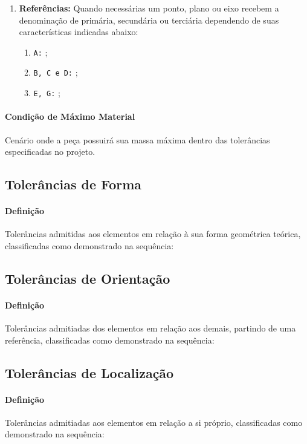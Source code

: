 \documentclass{article}
\begin{document}
\begin{enumerate}[rightmargin = \leftmargin]
                \item \textbf{Referências:} Quando necessárias um ponto, plano ou eixo recebem a denominação de primária, secundária ou terciária dependendo de suas características indicadas abaixo:
                    \begin{enumerate}[rightmargin = \leftmargin, noitemsep]
                        \item \texttt{A:} ;
                        \item \texttt{B, C e D:} ;
                        \item \texttt{E, G:} ;
                    \end{enumerate}
            \end{enumerate}

        \paragraph{Condição de Máximo Material}Cenário onde a peça possuirá sua massa máxima dentro das tolerâncias especificadas no projeto.

        \subsection{Tolerâncias de Forma}
            \paragraph{Definição}Tolerâncias admitidas aos elementos em relação à sua forma geométrica teórica, classificadas como demonstrado na sequência:

        \subsection{Tolerâncias de Orientação}
            \paragraph{Definição}Tolerâncias admitiadas dos elementos em relação aos demais, partindo de uma referência, classificadas como demonstrado na sequência:

        \subsection{Tolerâncias de Localização}
            \paragraph{Definição}Tolerâncias admitiadas aos elementos em relação a si próprio, classificadas como demonstrado na sequência:
\end{document}
